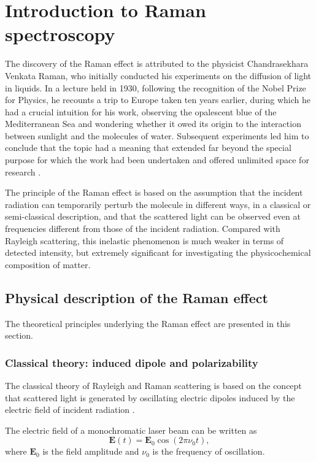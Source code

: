 \chapter{Introduction to Raman spectroscopy}
\label{ch:introduction}

The discovery of the Raman effect is attributed to the physicist Chandrasekhara Venkata Raman, who initially conducted his experiments on the diffusion of light in liquids. In a lecture held in 1930, following the recognition of the Nobel Prize for Physics, he recounts a trip to Europe taken ten years earlier, during which he had a crucial intuition for his work, observing the opalescent blue of the Mediterranean Sea and wondering whether it owed its origin to the interaction between sunlight and the molecules of water. Subsequent experiments led him to conclude that the topic had a meaning that extended far beyond the special purpose for which the work had been undertaken and offered unlimited space for research \cite{raman1930molecular}.

The principle of the Raman effect is based on the assumption that the incident radiation can temporarily perturb the molecule in different ways, in a classical or semi-classical description, and that the scattered light can be observed even at frequencies different from those of the incident radiation. Compared with Rayleigh scattering, this inelastic phenomenon is much weaker in terms of detected intensity, but extremely significant for investigating the physicochemical composition of matter.

\section{Physical description of the Raman effect}
\label{sec:theory_raman_effect}

The theoretical principles underlying the Raman effect are presented in this section.

\subsection{Classical theory: induced dipole and polarizability}
\label{subsec:classical_raman}


The classical theory of Rayleigh and Raman scattering is based on the concept that scattered light is generated by
oscillating electric dipoles induced by the electric field of incident radiation \cite{keresztury2002raman}. 

The electric field of a monochromatic laser beam can be written as
\begin{equation}
    \mathbf{E}(t) = \mathbf{E}_0 \cos(2\pi \nu_0 t),
    \label{eq:incident_field}
\end{equation}
where \(\mathbf{E}_0\) is the field amplitude and \(\nu_0\) is the frequency of oscillation.

